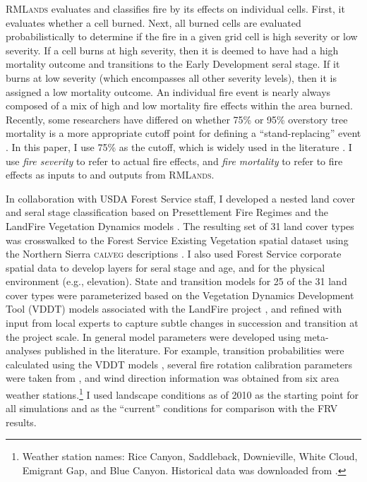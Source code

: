 \textsc{RMLands} evaluates and classifies fire by its effects on individual cells. First, it evaluates whether a cell burned. Next, all burned cells are evaluated probabilistically to determine if the fire in a given grid cell is high severity or low severity. If a cell burns at high severity, then it is deemed to have had a high mortality outcome and transitions to the Early Development seral stage. If it burns at low severity (which encompasses all other severity levels), then it is assigned a low mortality outcome. An individual fire event is nearly always composed of a mix of high and low mortality fire effects within the area burned. Recently, some researchers have differed on whether 75\% or 95\% overstory tree mortality is a more appropriate cutoff point for defining a ``stand-replacing'' event \citep{Fule2014,Mallek2013}. In this paper, I use 75\% as the cutoff, which is widely used in the literature \citep{Agee1993,Agee2007,Miller2009,Baker2014}. I use \emph{fire severity} to refer to actual fire effects, and \emph{fire mortality} to refer to fire effects as inputs to and outputs from \textsc{RMLands}.



In collaboration with USDA Forest Service staff, I developed a nested land cover and seral stage classification based on Presettlement Fire Regimes \citep{VandeWater2011} and the LandFire Vegetation Dynamics models \citep{Landfire2007}. The resulting set of 31 land cover types was crosswalked to the Forest Service Existing Vegetation spatial dataset \citep{USDAForestService2009} using the Northern Sierra \textsc{calveg} descriptions \citep{USDAForestService2008}. I also used Forest Service corporate spatial data to develop layers for seral stage and age, and for the physical environment (e.g., elevation). State and transition models for 25 of the 31 land cover types were parameterized based on the Vegetation Dynamics Development Tool (VDDT) models associated with the LandFire project \citep{Landfire2007}, and refined with input from local experts to capture subtle changes in succession and transition at the project scale. In general model parameters were developed using meta-analyses published in the literature. For example, transition probabilities were calculated using the VDDT models \citep{Landfire2007}, several fire rotation calibration parameters were taken from \citet{Mallek2013}, and wind direction information was obtained from six area weather stations.\footnote{Weather station names: Rice Canyon, Saddleback, Downieville, White Cloud, Emigrant Gap, and Blue Canyon. Historical data was downloaded from .} I used landscape conditions as of 2010 as the starting point for all simulations and as the ``current'' conditions for comparison with the FRV results.

